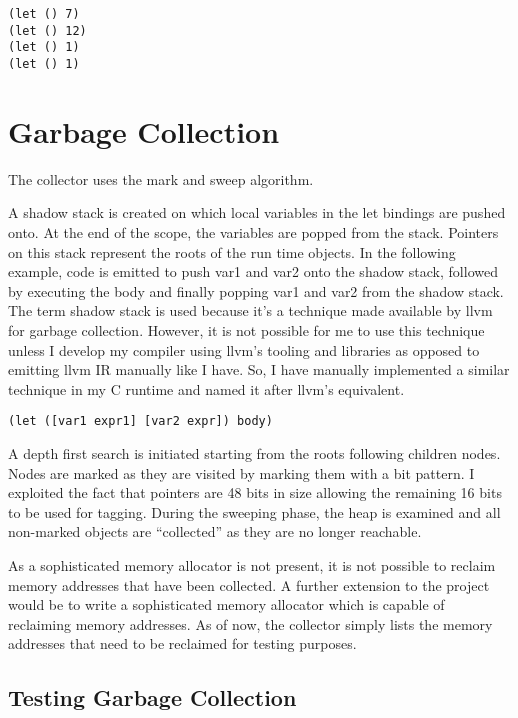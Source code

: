 \documentclass{article}
\begin{document}
\begin{verbatim}
(let () 7)
(let () 12)
(let () 1)
(let () 1)
\end{verbatim}

\section{Garbage Collection}

The collector uses the mark and sweep algorithm.

A shadow stack is created on which local variables in the let bindings are pushed onto. At the end of the scope, the variables are popped from the stack. Pointers on this stack represent the roots of the run time objects. In the following example, code is emitted to push var1 and var2 onto the shadow stack, followed by executing the body and finally popping var1 and var2 from the shadow stack. The term shadow stack is used because it's a technique made available by llvm for garbage collection. However, it is not possible for me to use this technique unless I develop my compiler using llvm's tooling and libraries as opposed to emitting llvm IR manually like I have. So, I have manually implemented a similar technique in my C runtime and named it after llvm's equivalent. 

\begin{verbatim}
(let ([var1 expr1] [var2 expr]) body)
\end{verbatim}

A depth first search is initiated starting from the roots following children nodes. Nodes are marked as they are visited by marking them with a bit pattern. I exploited the fact that pointers are 48 bits in size allowing the remaining 16 bits to be used for tagging. During the sweeping phase, the heap is examined and all non-marked objects are ``collected'' as they are no longer reachable.

As a sophisticated memory allocator is not present, it is not possible to reclaim memory addresses that have been collected. A further extension to the project would be to write a sophisticated memory allocator which is capable of reclaiming memory addresses. As of now, the collector simply lists the memory addresses that need to be reclaimed for testing purposes.

\subsection{Testing Garbage Collection}
\end{document}

